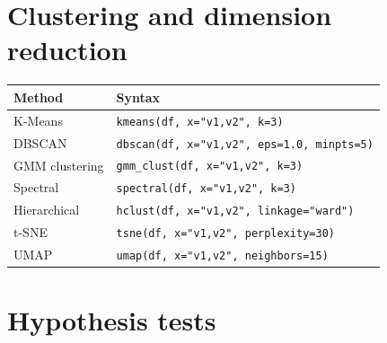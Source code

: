 \section{Clustering and dimension reduction}

\begin{center}
\begin{tabular}{ll}
\toprule
\textbf{Method} & \textbf{Syntax} \\
\midrule
K-Means           & \texttt{kmeans(df, x="v1,v2", k=3)} \\
DBSCAN            & \texttt{dbscan(df, x="v1,v2", eps=1.0, minpts=5)} \\
GMM clustering    & \texttt{gmm\_clust(df, x="v1,v2", k=3)} \\
Spectral\textdagger{}          & \texttt{spectral(df, x="v1,v2", k=3)} \\
Hierarchical      & \texttt{hclust(df, x="v1,v2", linkage="ward")} \\
t-SNE             & \texttt{tsne(df, x="v1,v2", perplexity=30)} \\
UMAP              & \texttt{umap(df, x="v1,v2", neighbors=15)} \\
\bottomrule
\end{tabular}
\end{center}

\section{Hypothesis tests}

